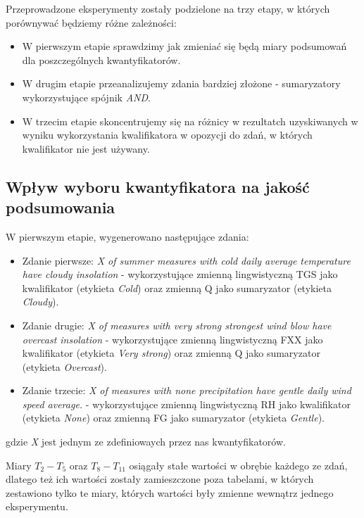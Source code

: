 \documentclass{classrep}
\begin{document}
Przeprowadzone eksperymenty zostały podzielone na trzy etapy, w których porównywać będziemy różne zależności:
\begin{itemize}[label=$\bullet$\scshape\bfseries]
\item W pierwszym etapie sprawdzimy jak zmieniać się będą miary podsumowań dla poszczególnych kwantyfikatorów.
\item W drugim etapie przeanalizujemy zdania bardziej złożone - sumaryzatory wykorzystujące spójnik \emph{AND}.
\item W trzecim etapie skoncentrujemy się na różnicy w rezultatch uzyskiwanych w wyniku wykorzystania kwalifikatora w opozycji do zdań, w których kwalifikator nie jest używany.
\end{itemize}


\subsection{Wpływ wyboru kwantyfikatora na jakość podsumowania}

W pierwszym etapie, wygenerowano następujące zdania:
\begin{itemize}[label=$\bullet$\scshape\bfseries]
\item Zdanie pierwsze: \textit{X of summer measures with cold daily average temperature have cloudy insolation} - wykorzystujące zmienną lingwistyczną TGS jako kwalifikator (etykieta \textit{Cold}) oraz zmienną Q jako sumaryzator (etykieta \textit{Cloudy}).
\item Zdanie drugie: \textit{X of measures with very strong strongest wind blow have overcast insolation} - wykorzystujące zmienną lingwistyczną FXX jako kwalifikator (etykieta \textit{Very strong}) oraz zmienną Q jako sumaryzator (etykieta \textit{Overcast}).
\item Zdanie trzecie: \textit{X of measures with none precipitation have gentle daily wind speed average.} - wykorzystujące zmienną lingwistyczną RH jako kwalifikator (etykieta \textit{None}) oraz zmienną FG jako sumaryzator (etykieta \textit{Gentle}).
\end{itemize}
gdzie \textit{X} jest jednym ze zdefiniowaych przez nas kwantyfikatorów.\newline

Miary $T_2 - T_5$ oraz $T_8 - T_{11}$ osiągały stałe wartości w obrębie każdego ze zdań, dlatego też ich wartości zostały zamieszczone poza tabelami, w których zestawiono tylko te miary, których wartości były zmienne wewnątrz jednego eksperymentu.
\end{document}
